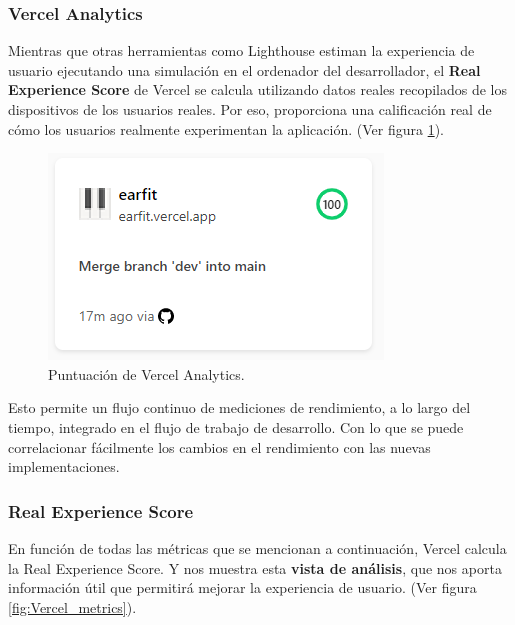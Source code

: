 \documentclass[12pt,twoside,titlepage]{report}
\begin{document}
{\subsubsection{Vercel Analytics}

Mientras que otras herramientas como Lighthouse estiman la experiencia de usuario ejecutando una simulación en el ordenador del desarrollador, el \textbf{Real Experience Score} de Vercel se calcula utilizando datos reales recopilados de los dispositivos de los usuarios reales. Por eso, proporciona una calificación real de cómo los usuarios realmente experimentan la aplicación.
(Ver figura \ref{fig:Vercel_metrics_resume}).

\begin{figure}[H]
    \centering
    \includegraphics[scale=0.8]{Vercel/VercelAnalyticsResume}
    \caption{Puntuación de Vercel Analytics.}
    \label{fig:Vercel_metrics_resume}
\end{figure}

Esto permite un flujo continuo de mediciones de rendimiento, a lo largo del tiempo, integrado en el flujo de trabajo de desarrollo. Con lo que se puede correlacionar fácilmente los cambios en el rendimiento con las nuevas implementaciones.

\subsubsection{Real Experience Score}

En función de todas las métricas que se mencionan a continuación, Vercel calcula la Real Experience Score. Y nos muestra esta \textbf{vista de análisis}, que nos aporta información útil que permitirá mejorar la experiencia de usuario.
(Ver figura \ref{fig:Vercel_metrics}).

}
\end{document}
